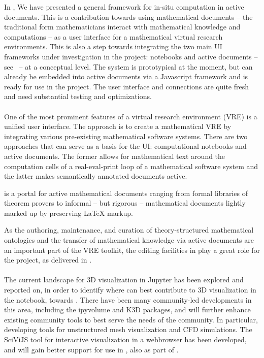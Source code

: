 \documentclass{deliverablereport}
\begin{document}
In , We have presented a general framework for in-situ computation in active documents. This is
a contribution towards using mathematical documents -- the traditional form mathematicians
interact with mathematical knowledge and computations -- as a user interface for a
mathematical virtual research environments. This is also a step towards integrating the
two main UI frameworks under investigation in the \ODK project: \Jupyter notebooks and
active documents -- see~ -- at a conceptual level. The system is
prototypical at the moment, but can already be embedded into active documents via a
Javascript framework and is ready for use in the \ODK project. The user interface and \SCSCP
connections are quite fresh and need substantial testing and optimizations.


\paragraph{}

One of the most prominent features of a virtual research environment (VRE) is a unified user interface. The \ODK approach is to create a mathematical VRE by integrating various pre-existing mathematical software systems. There are two approaches that can serve as a basis for the \ODK UI: computational notebooks and active documents. The former allows for mathematical text around the computation cells of a real-eval-print loop of a mathematical software system and the latter makes semantically annotated documents active.

\MathHub is a portal for active mathematical documents ranging from formal libraries of theorem provers to informal – but rigorous – mathematical documents lightly marked up by preserving LaTeX markup.

As the authoring, maintenance, and curation of theory-structured mathematical ontologies and the transfer of mathematical knowledge via active documents are an important part of the \ODK VRE toolkit, the editing facilities in \MathHub play a great role for the project,
as delivered in .

\paragraph{}

The current landscape for 3D visualization in Jupyter has been explored and reported on,
in order to identify where \ODK can best contribute to 3D visualization in the notebook, towards . There have been many community-led developments in this area, including the ipyvolume and K3D packages, and \ODK will further enhance existing community tools to best serve the needs of the community. In particular, developing tools for unstructured mesh visualization and CFD simulations. The SciViJS tool for interactive visualization in a webbrowser has been developed, and will gain better support for use in \Jupyter, also as part of .
\end{document}
